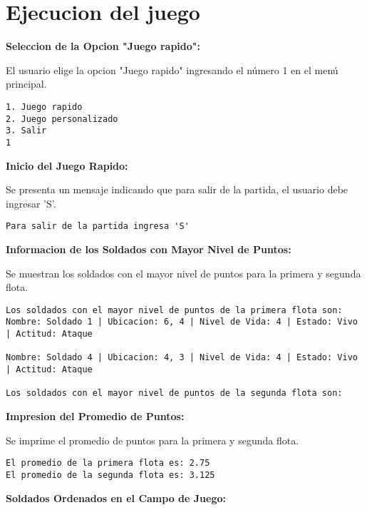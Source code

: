 \section{Ejecucion del juego}

\textbf{Seleccion de la Opcion "Juego rapido":}

El usuario elige la opcion "Juego rapido" ingresando el número 1 en el menú principal.
\begin{lstlisting}
1. Juego rapido
2. Juego personalizado
3. Salir
1
\end{lstlisting}

\textbf{Inicio del Juego Rapido:}

Se presenta un mensaje indicando que para salir de la partida, el usuario debe ingresar 'S'.
\begin{lstlisting}
Para salir de la partida ingresa 'S'
\end{lstlisting}

\textbf{Informacion de los Soldados con Mayor Nivel de Puntos:}

Se muestran los soldados con el mayor nivel de puntos para la primera y segunda flota.
\begin{lstlisting}
Los soldados con el mayor nivel de puntos de la primera flota son:
Nombre: Soldado 1 | Ubicacion: 6, 4 | Nivel de Vida: 4 | Estado: Vivo | Actitud: Ataque

Nombre: Soldado 4 | Ubicacion: 4, 3 | Nivel de Vida: 4 | Estado: Vivo | Actitud: Ataque

Los soldados con el mayor nivel de puntos de la segunda flota son:
\end{lstlisting}

\textbf{Impresion del Promedio de Puntos:}

Se imprime el promedio de puntos para la primera y segunda flota.
\begin{lstlisting}
El promedio de la primera flota es: 2.75
El promedio de la segunda flota es: 3.125
\end{lstlisting}

\textbf{Soldados Ordenados en el Campo de Juego:}

